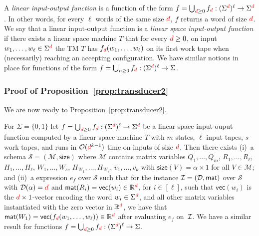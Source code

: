  A \textit{linear input-output function} is a function of the form 
$f=\bigcup_{{\color{red} d}\geq 0} f_{\color{red} d}:(\Sigma^{\color{red} d})^\ell\to\Sigma^{\color{red} d}$. In other words, for every $\ell$ words of the same 
size ${\color{red} d}$, $f$ returns a word of size ${\color{red} d}$. We say that a linear input-output function is a 
\textit{linear space input-output function} if
there exists a linear space machine  $T$ that for every ${\color{red} d}\geq 0$, on input $w_1,\ldots,w_\ell\in\Sigma^{\color{red} d}$ 
the TM $T$ has
$f_{\color{red} d}(w_1,\ldots,w_\ell)$ on its first work tape when (necessarily) reaching an accepting configuration.
We have similar notions in place for functions of the form $f=\bigcup_{n\geq 0} f_{\color{red} d}:(\Sigma^{\color{red} d})^\ell\to\Sigma$.

\subsubsection{Proof of Proposition~\ref{prop:transducer2}}
We are now ready to  Proposition~\ref{prop:transducer2}.

\begin{proposition}
	For $\Sigma = \{0,1\}$ let $f=\bigcup_{{\color{red} d}\geq 0}f_{\color{red} d}:(\Sigma^{\color{red} d})^\ell\to \Sigma^{\color{red} d}$ be a linear space input-ouput function 
	computed by a linear space  machine $T$ with $m$ states, $\ell$ input tapes, $s$ work tapes, and runs in $\mathcal{O}({\color{red} d}^{k-1})$ time on inputs of size ${\color{red} d}$. 
	Then there exists (i)~a \langfor 
	schema $\mathcal{S}=(\mathcal{M},\textsf{size})$ where $\mathcal{M}$ contains matrix 
	variables
	$Q_1,\ldots,Q_m$, $R_1,\ldots,R_\ell$, $H_1,\ldots,H_\ell$, $W_1,\ldots,W_s$, $H_{W_1},\ldots,H_{W_s}$, $v_1,\ldots,v_{k}$  
	with $\mathsf{size}(V)=\alpha\times 1$ for all $V\in\mathcal{M}$; and (ii)~a \langfor 
	expression $e_f$ over $\mathcal{S}$ such that for the instance 
	$\mathcal{I}=(\mathcal{D},\textsf{mat})$ over $\mathcal{S}$ with $\mathcal{D}(\alpha)={\color{red} d}$ and 
	$\mathsf{mat}(R_i)=\mathsf{vec}(w_i)\in \mathbb{R}^{\color{red} d}$, for $i\in[\ell]$, such that $\mathsf{vec}(w_i)$ is the ${\color{red} d}\times 1$-vector 
	encoding the word $w_i\in\Sigma^{\color{red} d}$, and all other matrix variables instantiated with the zero vector in $\mathbb{R}^{\color{red} d}$,  we have that  $\mathsf{mat}(W_1)=\mathsf{vec}(f_{\color{red} d}(w_1,\ldots,w_\ell))\in\mathbb{R}^{\color{red} d}$ 
	after evaluating $e_f$ on~$\mathcal{I}$. We have a similar result for functions $f=\bigcup_{{\color{red} d}\geq 0}f_{\color{red} d}:(\Sigma^{\color{red} d})^\ell\to \Sigma$.
\end{proposition}

